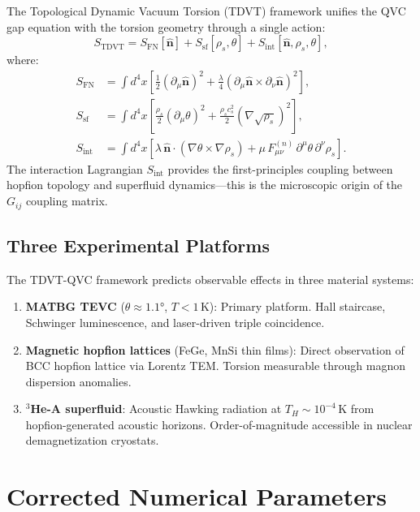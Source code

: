 \documentclass[11pt,letterpaper]{article}
\begin{document}
The Topological Dynamic Vacuum Torsion (TDVT) framework unifies the QVC gap equation with the torsion geometry through a single action:
\begin{equation}
S_{\text{TDVT}} = S_{\text{FN}}[\hat{\mathbf{n}}] + S_{\text{sf}}[\rho_s, \theta] + S_{\text{int}}[\hat{\mathbf{n}}, \rho_s, \theta],
\end{equation}
where:
\begin{align}
S_{\text{FN}} &= \int d^4x \left[\frac{1}{2}(\partial_\mu \hat{\mathbf{n}})^2 + \frac{\lambda}{4}(\partial_\mu \hat{\mathbf{n}} \times \partial_\nu \hat{\mathbf{n}})^2\right], \\
S_{\text{sf}} &= \int d^4x \left[\frac{\rho_s}{2}(\partial_\mu\theta)^2 + \frac{\rho_s c_s^2}{2}(\nabla\sqrt{\rho_s})^2\right], \\
S_{\text{int}} &= \int d^4x \left[\lambda\, \hat{\mathbf{n}} \cdot (\nabla\theta \times \nabla\rho_s) + \mu\, F^{(n)}_{\mu\nu}\, \partial^\mu\theta\, \partial^\nu\rho_s\right].
\end{align}
The interaction Lagrangian $S_{\text{int}}$ provides the first-principles coupling between hopfion topology and superfluid dynamics---this is the microscopic origin of the $G_{ij}$ coupling matrix.

\subsection{Three Experimental Platforms}

The TDVT-QVC framework predicts observable effects in three material systems:

\begin{enumerate}[label=\textbf{(\arabic*)}]
    \item \textbf{MATBG TEVC} ($\theta \approx 1.1°$, $T < 1$\,K): Primary platform. Hall staircase, Schwinger luminescence, and laser-driven triple coincidence.
    \item \textbf{Magnetic hopfion lattices} (FeGe, MnSi thin films): Direct observation of BCC hopfion lattice via Lorentz TEM. Torsion measurable through magnon dispersion anomalies.
    \item \textbf{${}^3$He-A superfluid}: Acoustic Hawking radiation at $T_H \sim 10^{-4}$\,K from hopfion-generated acoustic horizons. Order-of-magnitude accessible in nuclear demagnetization cryostats.
\end{enumerate}

\section{Corrected Numerical Parameters}
\label{sec:parameters}
\end{document}
